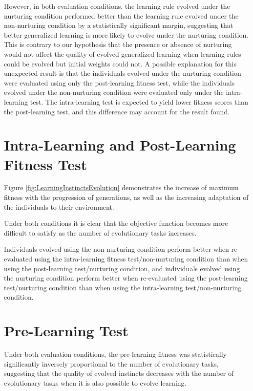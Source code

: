 \documentclass[master]{outhesis}
\begin{document}
However, in both evaluation conditions,
the learning rule evolved under the nurturing condition performed better than the learning rule evolved under the non-nurturing condition by a statistically significant margin,
suggesting that better generalized learning is more likely to evolve under the nurturing condition.
This is contrary to our hypothesis that the presence or absence of nurturing would not affect the quality of evolved generalized learning 
when learning rules could be evolved but initial weights could not.
A possible explanation for this unexpected result is that the individuals evolved under the nurturing condition were evaluated using only the post-learning fitness test,
while the individuals evolved under the non-nurturing condition were evaluated only under the intra-learning test.
The intra-learning test is expected to yield lower fitness scores than the post-learning test,
and this difference may account for the result found.

\section{Intra-Learning and Post-Learning Fitness Test}

Figure \ref{fig:LearningInstinctsEvolution} demonstrates the increase of maximum fitness with the progression of generations,
as well as the increasing adaptation of the individuals to their environment.

Under both conditions it is clear that the objective function becomes more difficult to satisfy as the number of evolutionary tasks increases. 

Individuals evolved using the non-nurturing condition perform better when re-evaluated using the intra-learning fitness test/non-nurturing condition than when using the post-learning test/nurturing condition,
and individuals evolved using the nurturing condition perform better when re-evaluated using the post-learning test/nurturing condition than when using the intra-learning test/non-nurturing condition.

\section{Pre-Learning Test}

Under both evaluation conditions, the pre-learning fitness was statistically significantly inversely proportional to the number of evolutionary tasks,
suggesting that the quality of evolved instincts decreases with the number of evolutionary tasks when it is also possible to evolve learning.
\end{document}
